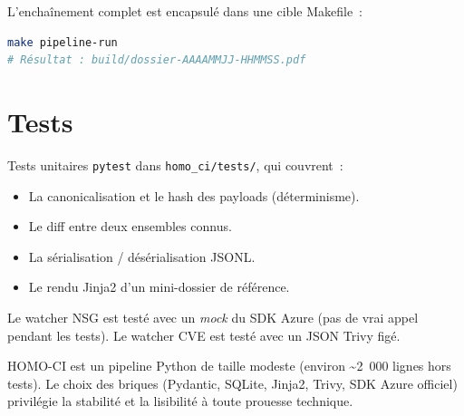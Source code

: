 L'enchaînement complet est encapsulé dans une cible Makefile~:

\begin{lstlisting}[language=bash]
make pipeline-run
# Résultat : build/dossier-AAAAMMJJ-HHMMSS.pdf
\end{lstlisting}

\section{Tests}

Tests unitaires \texttt{pytest} dans \texttt{homo\_ci/tests/}, qui
couvrent~:

\begin{itemize}
  \item La canonicalisation et le hash des payloads (déterminisme).
  \item Le diff entre deux ensembles connus.
  \item La sérialisation / désérialisation JSONL.
  \item Le rendu Jinja2 d'un mini-dossier de référence.
\end{itemize}

Le watcher NSG est testé avec un \emph{mock} du SDK Azure (pas de
vrai appel pendant les tests). Le watcher CVE est testé avec un
JSON Trivy figé.

\begin{takeaway}
HOMO-CI est un pipeline Python de taille modeste (environ
\textasciitilde 2~000 lignes hors tests). Le choix des briques
(Pydantic, SQLite, Jinja2, Trivy, SDK Azure officiel) privilégie
la stabilité et la lisibilité à toute prouesse technique.
\end{takeaway}
